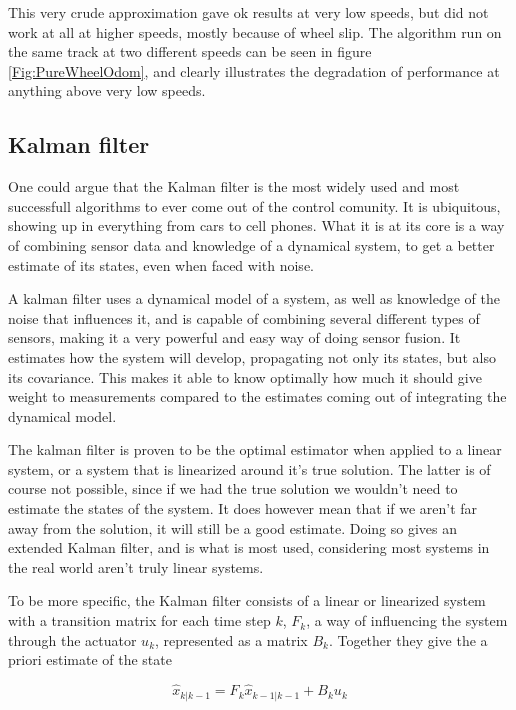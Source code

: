 This very crude approximation gave ok results at very low speeds, but did not work at all at higher speeds, mostly because of wheel slip. The algorithm run on the same track at two different speeds can be seen in figure \ref{Fig:PureWheelOdom}, and clearly illustrates the degradation of performance at anything above very low speeds.   

\subsection{Kalman filter}

One could argue that the Kalman filter is the most widely used and most successfull algorithms to ever come out of the control comunity. It is ubiquitous, showing up in everything from cars to cell phones. What it is at its core is a way of combining sensor data and knowledge of a dynamical system, to get a better estimate of its states, even when faced with noise. 

A kalman filter uses a dynamical model of a system, as well as knowledge of the noise that influences it, and is capable of combining several different types of sensors, making it a very powerful and easy way of doing sensor fusion. It estimates how the system will develop, propagating not only its states, but also its covariance. This makes it able to know optimally how much it should give weight to measurements compared to the estimates coming out of integrating the dynamical model. 

The kalman filter is proven to be the optimal estimator when applied to a linear system, or a system that is linearized around it's true solution. The latter is of course not possible, since if we had the true solution we wouldn't need to estimate the states of the system. It does however mean that if we aren't far away from the solution, it will still be a good estimate. Doing so gives an extended Kalman filter\cite{EKF}, and is what is most used, considering most systems in the real world aren't truly linear systems.  

To be more specific, the Kalman filter consists of a linear or linearized system with a transition matrix for each time step $k$, $F_{k}$, a way of influencing the system through the actuator $u_k$, represented as a matrix $B_{k}$. Together they give the a priori estimate of the state

\begin{equation}
    \hat{x}_{k|k-1} = F_k\hat{x}_{k-1|k-1} + B_k u_k
\end{equation}

